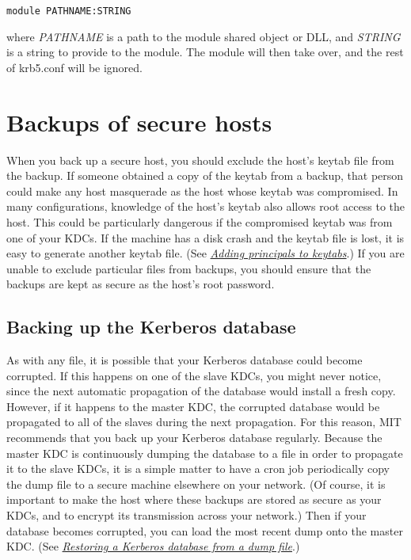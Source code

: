 \documentclass[letterpaper,10pt,english]{sphinxmanual}
\begin{document}
\begin{Verbatim}[commandchars=\\\{\}]
module PATHNAME:STRING
\end{Verbatim}

where \emph{PATHNAME} is a path to the module shared object or DLL, and
\emph{STRING} is a string to provide to the module.  The module will then
take over, and the rest of krb5.conf will be ignored.


\chapter{Backups of secure hosts}
\label{admin/backup_host:backups-of-secure-hosts}\label{admin/backup_host::doc}
When you back up a secure host, you should exclude the host's keytab
file from the backup.  If someone obtained a copy of the keytab from a
backup, that person could make any host masquerade as the host whose
keytab was compromised.  In many configurations, knowledge of the
host's keytab also allows root access to the host.  This could be
particularly dangerous if the compromised keytab was from one of your
KDCs.  If the machine has a disk crash and the keytab file is lost, it
is easy to generate another keytab file.  (See {\hyperref[admin/appl_servers:add-princ-kt]{\emph{Adding principals to keytabs}}}.)
If you are unable to exclude particular files from backups, you should
ensure that the backups are kept as secure as the host's root
password.


\section{Backing up the Kerberos database}
\label{admin/backup_host:backing-up-the-kerberos-database}
As with any file, it is possible that your Kerberos database could
become corrupted.  If this happens on one of the slave KDCs, you might
never notice, since the next automatic propagation of the database
would install a fresh copy.  However, if it happens to the master KDC,
the corrupted database would be propagated to all of the slaves during
the next propagation.  For this reason, MIT recommends that you back
up your Kerberos database regularly.  Because the master KDC is
continuously dumping the database to a file in order to propagate it
to the slave KDCs, it is a simple matter to have a cron job
periodically copy the dump file to a secure machine elsewhere on your
network.  (Of course, it is important to make the host where these
backups are stored as secure as your KDCs, and to encrypt its
transmission across your network.)  Then if your database becomes
corrupted, you can load the most recent dump onto the master KDC.
(See {\hyperref[admin/database:restore-from-dump]{\emph{Restoring a Kerberos database from a dump file}}}.)
\end{document}

